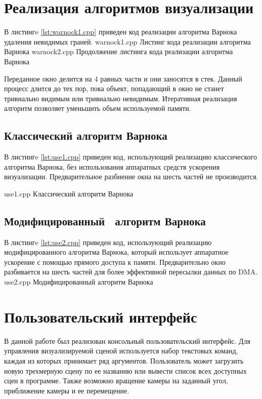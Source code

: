 \section{Реализация алгоритмов визуализации}
В листингe \ref{lst:warnock1.cpp} приведен код реализации алгоритма Варнока удаления невидимых граней.
\pagebreak
{}
    {warnock1.cpp}
    {Листинг кода реализации алгоритма Варнока}
\pagebreak
{}
    {warnock2.cpp}
    {Продолжение листинга кода реализации алгоритма Варнока}

Переданное окно делится на 4 равных части и они заносятся в стек. Данный процесс длится до тех пор, пока объект, попадающий в окно не станет тривиально видимым или тривиально невидимым. Итеративная реализация алгоритм позволяет уменьшить объем используемой памяти.

\subsection{Классический алгоритм Варнока}
В листингe \ref{lst:use1.cpp} приведен код, использующий реализацию классического алгоритма Варнока, без использования аппаратных средств ускорения визуализации. Предварительное разбиение окна на шесть частей не производится.

\pagebreak
{}
    {use1.cpp}
    {Классический алгоритм Варнока}

\subsection{Модифицированный  алгоритм Варнока}
В листингe \ref{lst:use2.cpp} приведен код, использующий реализацию модифицированного алгоритма Варнока, который использует аппаратное ускорение с помощью прямого доступа к памяти. Предварительно окно разбивается на шесть частей для более эффективной пересылки данных по DMA. 
    {use2.cpp}
    {Модифицированный алгоритм Варнока}

\section{Пользовательский интерфейс}
В данной работе был реализован консольный пользовательский интерфейс. Для управления визуализируемой сценой используется набор текстовых команд, каждая из которых принимает ряд аргументов. Пользователь может загрузить новую трехмерную сцену по ее названию или вывести список всех доступных сцен в программе. Также возможно вращение камеры на заданный угол, приближение камеры и ее перемещение. 

